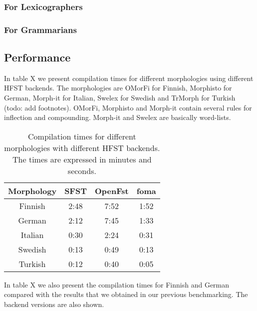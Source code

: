 \documentclass{llncs}
\begin{document}
\subsubsection{For Lexicographers}

\subsubsection{For Grammarians}

\subsection{Performance}

In table X we present compilation times for different morphologies using 
different HFST backends. The morphologies are OMorFi for Finnish, Morphisto 
for German, Morph-it for Italian, Swelex for Swedish and TrMorph for Turkish 
(todo: add footnotes). OMorFi, Morphisto and Morph-it contain several rules for
inflection and compounding. Morph-it and Swelex are basically word-lists.


\begin{table}
  \caption{Compilation times for different morphologies with
    different HFST backends. The times are expressed in minutes and seconds.}
  \label{tab:compilation_times}
  \begin{tabular}{ c  c  c  c }
    \hline
    Morphology & SFST & OpenFst & foma \\ \hline
    Finnish & 2:48 & 7:52 & 1:52 \\ \hline
    German & 2:12 & 7:45 & 1:33 \\ \hline
    Italian & 0:30 & 2:24 & 0:31 \\ \hline
    Swedish & 0:13 & 0:49 & 0:13 \\ \hline
    Turkish & 0:12 & 0:40 & 0:05 \\ \hline
    \end{tabular}
\end{table}


In table X we also present the compilation times for Finnish and German compared
with the results that we obtained in our previous benchmarking. The backend
versions are also shown.
\end{document}
